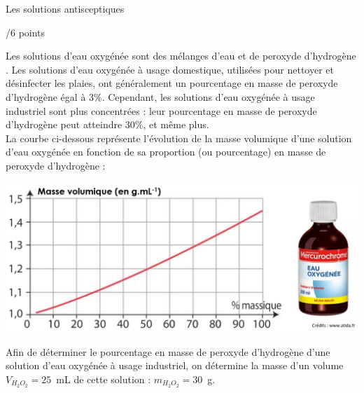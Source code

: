 \begin{doc}{Les solutions antisceptiques \begin{Large}
    /6 points
\end{Large}}
Les solutions d’eau oxygénée sont des mélanges d’eau et de peroxyde d’hydrogène . Les solutions d’eau oxygénée à usage domestique, utilisées pour nettoyer et désinfecter les plaies, ont généralement un pourcentage en masse de peroxyde d’hydrogène égal à 3\%. Cependant, les solutions d’eau oxygénée à usage industriel sont plus concentrées : leur pourcentage en masse de peroxyde d’hydrogène peut atteindre 30\%, et même plus.\\

La courbe ci-dessous représente l’évolution de la masse volumique d’une solution d’eau oxygénée en fonction de sa proportion (ou pourcentage) en masse de peroxyde d’hydrogène :

\begin{center}
    \includegraphics[scale=0.4]{Images/DS/DS1/Peroxyde_hydrogene.png}
\end{center}

Afin de déterminer le pourcentage en masse de peroxyde d’hydrogène d’une solution d’eau oxygénée à usage industriel, on détermine la masse d’un volume $V_{H_2O_2} = 25$~mL de cette solution : $m_{H_2O_2} = 30$~g.\\
\end{doc}
